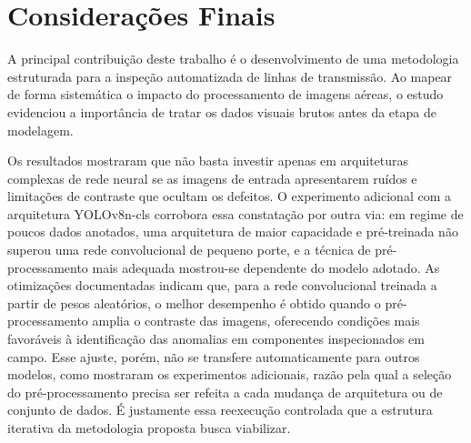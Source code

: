 \section{Considerações Finais}
A principal contribuição deste trabalho é o desenvolvimento de uma metodologia estruturada para a inspeção automatizada de linhas de transmissão. Ao mapear de forma sistemática o impacto do processamento de imagens aéreas, o estudo evidenciou a importância de tratar os dados visuais brutos antes da etapa de modelagem.

Os resultados mostraram que não basta investir apenas em arquiteturas complexas de rede neural se as imagens de entrada apresentarem ruídos e limitações de contraste que ocultam os defeitos. O experimento adicional com a arquitetura YOLOv8n-cls corrobora essa constatação por outra via: em regime de poucos dados anotados, uma arquitetura de maior capacidade e pré-treinada não superou uma rede convolucional de pequeno porte, e a técnica de pré-processamento mais adequada mostrou-se dependente do modelo adotado. As otimizações documentadas indicam que, para a rede convolucional treinada a partir de pesos aleatórios, o melhor desempenho é obtido quando o pré-processamento amplia o contraste das imagens, oferecendo condições mais favoráveis à identificação das anomalias em componentes inspecionados em campo. Esse ajuste, porém, não se transfere automaticamente para outros modelos, como mostraram os experimentos adicionais, razão pela qual a seleção do pré-processamento precisa ser refeita a cada mudança de arquitetura ou de conjunto de dados. É justamente essa reexecução controlada que a estrutura iterativa da metodologia proposta busca viabilizar.
